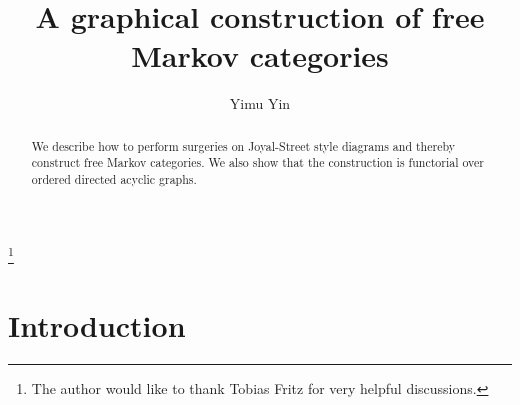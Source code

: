 \documentclass[12pt]{amsart}
\theoremstyle{plain}
\theoremstyle{definition}
\theoremstyle{remark}
\numberwithin{equation}{section}
\theoremstyle{plain}
\newcommand{\0}{\emptyset}
\begin{document}
\title{A graphical construction of free Markov categories}

\author[Y. Yin]{Yimu Yin}
\address[Y. Yin]{Pasadena, California}


\thanks{The author would like to thank Tobias Fritz for very helpful discussions.}


\begin{abstract}
We describe how to perform surgeries on Joyal-Street style diagrams and thereby construct free Markov categories. We also show that the construction is functorial over ordered directed acyclic graphs.
\end{abstract}



\maketitle

\tableofcontents



\section{Introduction}
\end{document}
